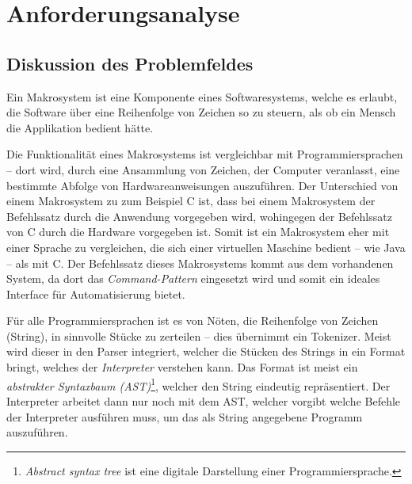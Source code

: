 \section{An\-for\-de\-rungs\-ana\-ly\-se}
\label{sec:Anforderungsanalyse}

  \subsection{Diskussion des Problemfeldes}
  \label{ssec:Diskussion des Problemfeldes}
    Ein Makrosystem ist eine Komponente eines Softwaresystems, welche es erlaubt, die Software über eine Reihenfolge von Zeichen so zu steuern, als ob ein Mensch die Applikation bedient hätte.

    Die Funktionalität eines Makrosystems ist vergleichbar mit Programmiersprachen -- dort wird, durch eine Ansammlung von Zeichen, der Computer veranlasst, eine bestimmte Abfolge von Hardwareanweisungen auszuführen. Der Unterschied von einem Makrosystem zu zum Beispiel C ist, dass bei einem Makrosystem der Befehlssatz durch die Anwendung vorgegeben wird, wohingegen der Befehlssatz von C durch die Hardware vorgegeben ist. Somit ist ein Makrosystem eher mit einer Sprache zu vergleichen, die sich einer virtuellen Maschine bedient -- wie Java -- als mit C.
    Der Befehlssatz dieses Makrosystems kommt aus dem vorhandenen System, da dort das \emph{Command-Pattern}\autocite[S.263]{Gamma:1995:DPE:186897} eingesetzt wird und somit ein ideales Interface für Automatisierung bietet.

    Für
    alle Programmiersprachen ist es von Nöten, die Reihenfolge von Zeichen (String), in sinnvolle Stücke zu zerteilen -- dies übernimmt ein Tokenizer. Meist wird dieser in den Parser integriert, welcher die Stücken des Strings in ein Format bringt, welches der \emph{Interpreter}\autocite[S.274]{Gamma:1995:DPE:186897} verstehen kann. Das Format ist meist ein \emph{abstrakter Syntaxbaum (AST)}\footnote{%
      \textit{Abstract syntax tree} ist eine digitale Darstellung einer Programmiersprache.
    }, welcher den String eindeutig repräsentiert. Der Interpreter arbeitet dann nur noch mit dem AST, welcher vorgibt welche Befehle der Interpreter ausführen muss, um das als String angegebene Programm auszuführen.

